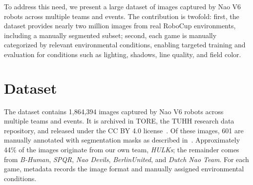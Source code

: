\documentclass[a4paper, runningheads, orivec]{llncs}
\begin{document}
To address this need, we present a large dataset of images captured by Nao V6 robots across multiple teams and events.
The contribution is twofold: first, the dataset provides nearly two million images from real RoboCup environments, including a manually segmented subset; second, each game is manually categorized by relevant environmental conditions, enabling targeted training and evaluation for conditions such as lighting, shadows, line quality, and field color.

\section{Dataset}

The dataset contains 1,864,394 images captured by Nao V6 robots across multiple teams and events.
It is archived in TORE, the TUHH research data repository, and released under the CC BY 4.0 license~\cite{goettsch2026dataset}.
Of these images, 601 are manually annotated with segmentation masks as described in~.
Approximately 44\% of the images originate from our own team, \textit{HULKs}; the remainder comes from \textit{B-Human}, \textit{SPQR}, \textit{Nao Devils}, \textit{BerlinUnited}, and \textit{Dutch Nao Team}.
For each game, metadata records the image format and manually assigned environmental conditions.
\end{document}
